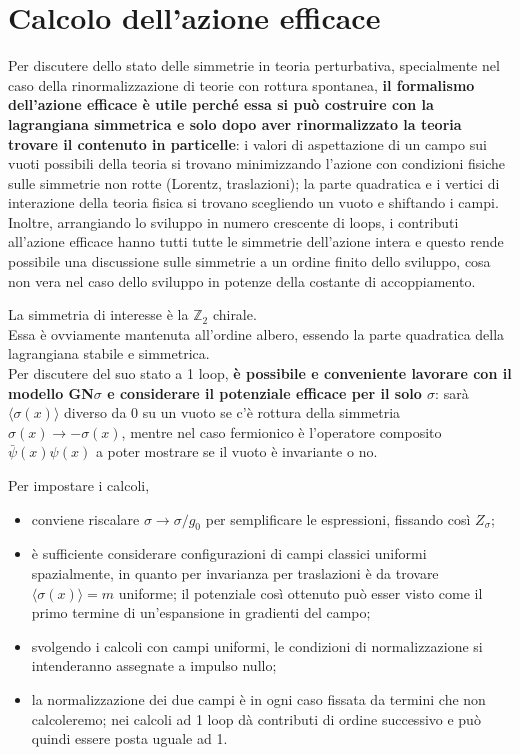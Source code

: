 \documentclass[a4paper,11pt]{amsart}
\newcommand{\mean}[1]{\ensuremath{\langle #1 \rangle}}
\newcommand{\nl}{\vskip 0.3cm}
\newcommand{\psibar}{\bar{\psi}}
\newcommand{\ssection}[2]{\section{ \texorpdfstring{\textbf{#1}}{#2} }}
\begin{document}
\ssection{Calcolo dell'azione efficace}{Calcolo}
Per discutere dello stato delle simmetrie in teoria perturbativa, specialmente nel caso della rinormalizzazione di teorie con rottura spontanea, \textbf{il formalismo dell'azione efficace è utile perché essa si può costruire con la lagrangiana simmetrica e solo dopo aver rinormalizzato la teoria trovare il contenuto in particelle}: i valori di aspettazione di un campo sui vuoti possibili della teoria si trovano minimizzando l'azione con condizioni fisiche sulle simmetrie non rotte (Lorentz, traslazioni); la parte quadratica e i vertici di interazione della teoria fisica si trovano scegliendo un vuoto e shiftando i campi.\\
Inoltre, arrangiando lo sviluppo in numero crescente di loops, i contributi all'azione efficace hanno tutti tutte le simmetrie dell'azione intera e questo rende possibile una discussione sulle simmetrie a un ordine finito dello sviluppo, cosa non vera nel caso dello sviluppo in potenze della costante di accoppiamento. 
\nl

La simmetria di interesse è la $\mathbb{Z}_2 $ chirale.\\
Essa è ovviamente mantenuta all'ordine albero, essendo la parte quadratica della lagrangiana stabile e simmetrica.\\
Per discutere del suo stato a 1 loop, \textbf{è possibile e conveniente lavorare con il modello GN$\sigma$ e considerare il potenziale efficace per il solo $\sigma$}: sarà $\mean{\sigma(x)}$ diverso da 0 su un vuoto se c'è rottura della simmetria $\sigma(x) \to - \sigma(x)$, mentre nel caso fermionico è l'operatore composito $\psibar(x)\psi(x)$ a poter mostrare se il vuoto è invariante o no.
\nl

Per impostare i calcoli,
\begin{itemize}
 \item conviene riscalare $\sigma \to \sigma/g_0$ per semplificare le espressioni, fissando così $Z_{\sigma}$; 
 \item è sufficiente considerare configurazioni di campi classici uniformi spazialmente, in quanto per invarianza per traslazioni è da trovare $\mean{\sigma(x)} = m$ uniforme; il potenziale così ottenuto può esser visto come il primo termine di un'espansione in gradienti del campo;
 \item svolgendo i calcoli con campi uniformi, le condizioni di normalizzazione si intenderanno assegnate a impulso nullo;
 \item la normalizzazione dei due campi è in ogni caso fissata da termini che non calcoleremo; nei calcoli ad 1 loop dà contributi di ordine successivo e può quindi essere posta uguale ad 1.
\end{itemize}
\nl
\end{document}
